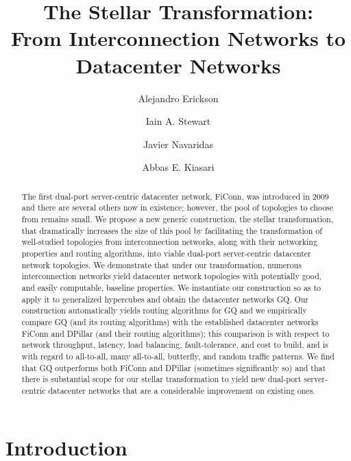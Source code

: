 \documentclass[]{amsart}
\title{The Stellar Transformation:\\ From Interconnection Networks to
  Datacenter Networks}
\author{Alejandro Erickson}
\author{Iain A. Stewart}
\author{Javier Navaridas}
\author{Abbas E. Kiasari}
\begin{document}
\maketitle

\begin{abstract}
The first dual-port server-centric datacenter network, FiConn, was introduced in 2009 and there are several others now in existence; however, the pool of topologies to choose from remains small.  We propose a new generic construction, the stellar transformation, that dramatically increases the size of this pool by facilitating the transformation of well-studied topologies from interconnection networks, along with their networking properties and routing algorithms, into viable dual-port server-centric datacenter network topologies.  We demonstrate that under our transformation, numerous interconnection networks yield datacenter network topologies with potentially good, and easily computable, baseline  properties. We instantiate our construction so as to apply it to generalized hypercubes and obtain the datacenter networks GQ.  Our construction automatically yields routing algorithms for GQ and we empirically compare GQ (and its routing algorithms) with the established datacenter networks FiConn and DPillar (and their routing algorithms); this comparison is with respect to network throughput, latency, load balancing, fault-tolerance, and cost to build, and is with regard to all-to-all, many all-to-all, butterfly, and random traffic patterns.  We find that GQ outperforms both FiConn and DPillar (sometimes significantly so) and that there is substantial scope for our stellar transformation to yield new dual-port server-centric datacenter networks that are a considerable improvement on existing ones.
\end{abstract}



\section{Introduction}\label{sec:introduction}
\end{document}

